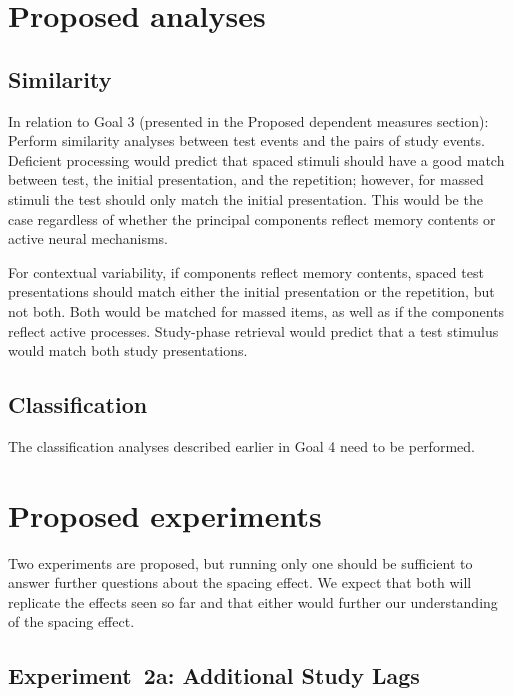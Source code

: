 
\section{Proposed analyses}

\subsection{Similarity}

In relation to Goal 3 (presented in the Proposed dependent measures section): Perform similarity analyses between test events and the pairs of study events.  Deficient processing would predict that spaced stimuli should have a good match between test, the initial presentation, and the repetition; however, for massed stimuli the test should only match the initial presentation.  This would be the case regardless of whether the principal components reflect memory contents or active neural mechanisms.

For contextual variability, if components reflect memory contents, spaced test presentations should match either the initial presentation or the repetition, but not both.  Both would be matched for massed items, as well as if the components reflect active processes.
Study-phase retrieval would predict that a test stimulus would match both study presentations.

\subsection{Classification}

The classification analyses described earlier in Goal 4 need to be performed.

\section{Proposed experiments}

Two experiments are proposed, but running only one should be sufficient to answer further questions about the spacing effect.  We expect that both will replicate the effects seen so far and that either would further our understanding of the spacing effect.

\subsection{Experiment~2a: Additional Study Lags}

